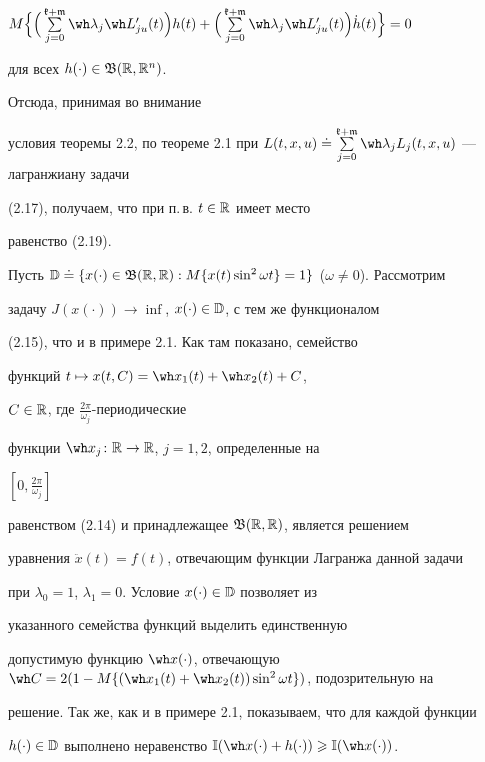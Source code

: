 \begin{pf}
$M\Big\{\Big(\sum\limits_{j=0}^{\frak


k+\frak m}\wh\lambda_j\wh L'_{ju}(t)\Big)h(t)+


\Big(\sum\limits_{j=0}^{\frak


k+\frak m}\wh\lambda_j\wh L'_{ju}(t)\Big)\Dot h(t)\Big\}=0$


для всех $h(\cdot)\in\frak B(\Bbb R,\Bbb R^n)$.


Отсюда, принимая во внимание


условия теоремы 2.2, по теореме 2.1 при $L(t,x,u)\doteq


\sum\limits_{j=0}^{\frak


k+\frak m}\wh\lambda_jL_j(t,x,u)$ --- лагранжиану задачи


(2.17), получаем, что при п.\,в. $t\in\Bbb R$ имеет место


равенство (2.19).


\end{pf}





\begin{exams}


Пусть $\Bbb D\doteq\{x(\cdot)\in\frak B(\Bbb R,\Bbb R):


M\{x(t)\sin^2\omega t\}=1\}$ ($\omega\ne0$). Рассмотрим


задачу $J(x(\cdot))\to\inf$, $x(\cdot)\in\Bbb D$, с тем же функционалом


(2.15), что и в примере 2.1. Как там показано, семейство


функций $t\mapsto x(t,C)=\wh x_1(t)+\wh x_2(t)+C$,


$C\in\Bbb R$, где $\frac{2\pi}{\omega_j}$-периодические


функции $\wh x_j\colon \Bbb R\to\Bbb R$, $j=1,2$, определенные на


$[0,\frac{2\pi}{\omega_j}]$


равенством (2.14) и принадлежащее $\frak B({\Bbb R},\Bbb R)$, является решением


уравнения $\ddot x(t)=f(t)$, отвечающим функции Лагранжа данной задачи


при $\lambda_0=1$, $\lambda_1=0$. Условие $x(\cdot)\in{\Bbb D}$ позволяет из


указанного семейства функций выделить единственную


допустимую функцию $\wh x(\cdot)$, отвечающую $\wh


C=2(1-M\{(\wh x_1(t)+\wh x_2(t))\sin^2\omega t\})$, подозрительную на


решение. Так же, как и в примере 2.1, показываем, что для каждой функции


$h(\cdot)\in{\Bbb D}$ выполнено неравенство $\Bbb I(\wh


x(\cdot)+h(\cdot))\geqslant\Bbb I(\wh x(\cdot))$.


\end{exams}





